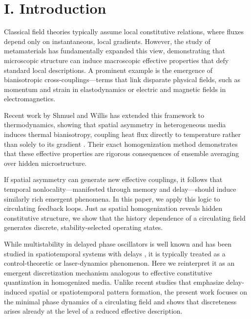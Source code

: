 \documentclass[11pt,a4paper]{article}
\begin{document}
\section*{I. Introduction}
Classical field theories typically assume local constitutive relations, where fluxes depend only on instantaneous, local gradients. However, the study of metamaterials has fundamentally expanded this view, demonstrating that microscopic structure can induce macroscopic effective properties that defy standard local descriptions. A prominent example is the emergence of bianisotropic cross-couplings—terms that link disparate physical fields, such as momentum and strain in elastodynamics or electric and magnetic fields in electromagnetics.

Recent work by Shmuel and Willis has extended this framework to thermodynamics, showing that spatial asymmetry in heterogeneous media induces thermal bianisotropy, coupling heat flux directly to temperature rather than solely to its gradient \cite{Willis2012}. Their exact homogenization method demonstrates that these effective properties are rigorous consequences of ensemble averaging over hidden microstructure.

If spatial asymmetry can generate new effective couplings, it follows that temporal nonlocality—manifested through memory and delay—should induce similarly rich emergent phenomena. In this paper, we apply this logic to circulating feedback loops. Just as spatial homogenization reveals hidden constitutive structure, we show that the history dependence of a circulating field generates discrete, stability-selected operating states.

While multistability in delayed phase oscillators is well known and has been studied in spatiotemporal systems with delays \cite{Yanchuk2017}, it is typically treated as a control-theoretic or laser-dynamics phenomenon. Here we reinterpret it as an emergent discretization mechanism analogous to effective constitutive quantization in homogenized media. Unlike recent studies that emphasize delay-induced spatial or spatiotemporal pattern formation, the present work focuses on the minimal phase dynamics of a circulating field and shows that discreteness arises already at the level of a reduced effective description.
\end{document}
